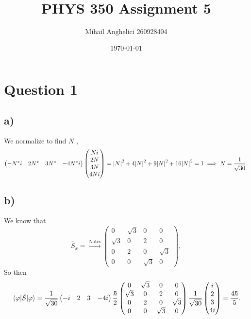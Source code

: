 \documentclass[12pt]{article}
\title{PHYS 350 Assignment 5}
\author{Mihail Anghelici 260928404 }
\date{\today}
\theoremstyle{definition}
\theoremstyle{definition}
\theoremstyle{definition}
\theoremstyle{definition}
\theoremstyle{definition}
\theoremstyle{example}
\theoremstyle{note}
\theoremstyle{remark}
\theoremstyle{example}
\begin{document}
	\maketitle
		\section*{Question 1}
			\subsection*{a) }
				
			We normalize to find $N$ ,
			\begin{gather*}
				\begin{pmatrix}
					-N^{\ast} i & 2 N^{\ast} & 3N^{\ast} & -4N^{\ast} i 
 				\end{pmatrix}\begin{pmatrix}
 					Ni \\ 2N \\ 3N \\ 4Ni
 				\end{pmatrix} = \abs{N}^{2} + 4\abs{N}^{2} + 9 \abs{N}^{2} + 16\abs{N}^{2} =1 \implies N = \frac{1}{\sqrt{30}}.
			\end{gather*}
			\subsection*{b) }
				We know that 
				$$ \hat{S}_{x} =\xrightarrow{\text{Notes}} \begin{pmatrix}
					0& \sqrt{3} & 0 & 0 \\
					\sqrt{3}&0 & 2 & 0 \\
					0 & 2 & 0 & \sqrt{3} \\
					0 & 0 & \sqrt{3} & 0
				\end{pmatrix},$$
				So then 
				\begin{gather*}
					\mel{\varphi}{\hat{S}_{}}{\varphi} = \frac{1}{\sqrt{30}} \begin{pmatrix}
						-i & 2 & 3 & -4i
					\end{pmatrix}\frac{\hbar}{2} \begin{pmatrix}
					0 &\sqrt{3} & 0 & 0 \\
					\sqrt{3} &0& 2 & 0 \\
					0 & 2 & 0 & \sqrt{3} \\
					0 & 0 & \sqrt{3} & 0
					\end{pmatrix} \frac{1}{\sqrt{30}}\begin{pmatrix}
						i \\ 2\\ 3\\ 4i
					\end{pmatrix} = \frac{4\hbar}{5}.
				\end{gather*}
\end{document}
